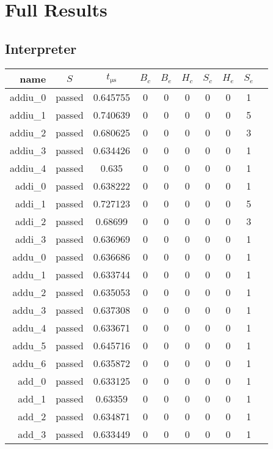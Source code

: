 \section{Full Results}

\subsection{Interpreter}
\begin{longtable}{r|ccccccccc}
    \toprule
    name & $S$ & $t_{\si{\micro\second}}$ & $B_c$ & $B_e$ & $H_c$ & $S_c$ & $H_e$ & $S_e$ \\
    \midrule
    \endhead

    addiu\_0 & passed & 0.645755 & 0 & 0 & 0 & 0 & 0 & 1 \\
    addiu\_1 & passed & 0.740639 & 0 & 0 & 0 & 0 & 0 & 5 \\
    addiu\_2 & passed & 0.680625 & 0 & 0 & 0 & 0 & 0 & 3 \\
    addiu\_3 & passed & 0.634426 & 0 & 0 & 0 & 0 & 0 & 1 \\
    addiu\_4 & passed & 0.635 & 0 & 0 & 0 & 0 & 0 & 1 \\
    addi\_0 & passed & 0.638222 & 0 & 0 & 0 & 0 & 0 & 1 \\
    addi\_1 & passed & 0.727123 & 0 & 0 & 0 & 0 & 0 & 5 \\
    addi\_2 & passed & 0.68699 & 0 & 0 & 0 & 0 & 0 & 3 \\
    addi\_3 & passed & 0.636969 & 0 & 0 & 0 & 0 & 0 & 1 \\
    addu\_0 & passed & 0.636686 & 0 & 0 & 0 & 0 & 0 & 1 \\
    addu\_1 & passed & 0.633744 & 0 & 0 & 0 & 0 & 0 & 1 \\
    addu\_2 & passed & 0.635053 & 0 & 0 & 0 & 0 & 0 & 1 \\
    addu\_3 & passed & 0.637308 & 0 & 0 & 0 & 0 & 0 & 1 \\
    addu\_4 & passed & 0.633671 & 0 & 0 & 0 & 0 & 0 & 1 \\
    addu\_5 & passed & 0.645716 & 0 & 0 & 0 & 0 & 0 & 1 \\
    addu\_6 & passed & 0.635872 & 0 & 0 & 0 & 0 & 0 & 1 \\
    add\_0 & passed & 0.633125 & 0 & 0 & 0 & 0 & 0 & 1 \\
    add\_1 & passed & 0.63359 & 0 & 0 & 0 & 0 & 0 & 1 \\
    add\_2 & passed & 0.634871 & 0 & 0 & 0 & 0 & 0 & 1 \\
    add\_3 & passed & 0.633449 & 0 & 0 & 0 & 0 & 0 & 1 \\

\end{longtable}
